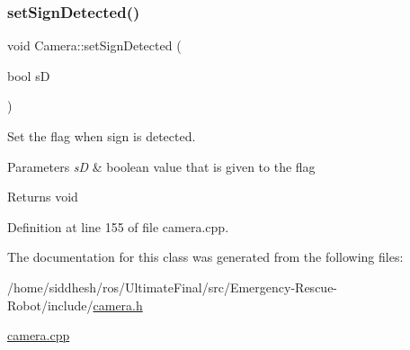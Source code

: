 \subsubsection{\texorpdfstring{set\+Sign\+Detected()}{setSignDetected()}}
{\footnotesize\ttfamily void Camera\+::set\+Sign\+Detected (\begin{DoxyParamCaption}\item[{bool}]{sD }\end{DoxyParamCaption})}



Set the flag when sign is detected. 


\begin{DoxyParams}{Parameters}
{\em sD} & boolean value that is given to the flag \\
\hline
\end{DoxyParams}
\begin{DoxyReturn}{Returns}
void 
\end{DoxyReturn}


Definition at line 155 of file camera.\+cpp.



The documentation for this class was generated from the following files\+:\begin{DoxyCompactItemize}
\item 
/home/siddhesh/ros/\+Ultimate\+Final/src/\+Emergency-\/\+Rescue-\/\+Robot/include/\mbox{\hyperlink{camera_8h}{camera.\+h}}\item 
\mbox{\hyperlink{camera_8cpp}{camera.\+cpp}}\end{DoxyCompactItemize}
